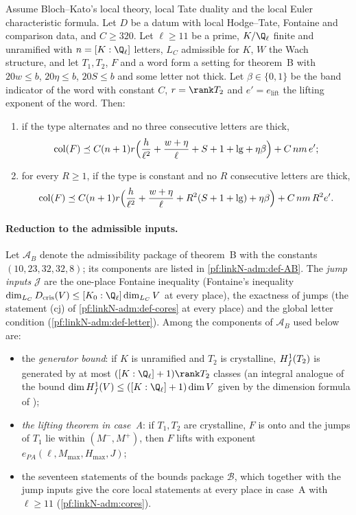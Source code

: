 \begin{theorem}[Theorem~B]\label{pf:linkN-adm:thmB}
Assume Bloch--Kato's local theory, local Tate duality and the local Euler characteristic formula. Let $D$ be a datum with
local Hodge--Tate, Fontaine and comparison data, and $C\ge320$. Let $\ell\ge11$ be a prime, $K/\Q_\ell$ finite and
unramified with $n=[K:\Q_\ell]$ letters, $L_C$ admissible for $K$, $W$ the Wach structure, and let $T_1,T_2$, $F$ and a word
form a setting for theorem~B with $20w\le b$, $20\eta\le b$, $20S\le b$ and some letter not thick. Let $\beta\in\{0,1\}$ be the band
indicator of the word with constant $C$, $r=\rank T_2$ and $e'=e_{\mathrm{lift}}$ the lifting exponent of the word. Then:
\begin{enumerate}[label=(\alph*)]
\item if the type alternates and no three consecutive letters are thick,
\[
\operatorname{col}(F)\preceq C(n+1)r\Bigl(\frac h{\ell^2}+\frac{w+\eta}{\ell}+S+1+\mathrm{lg}+\eta\beta\Bigr)+C\,nm\,e';
\]
\item for every $R\ge1$, if the type is constant and no $R$ consecutive letters are thick,
\[
\operatorname{col}(F)\preceq C(n+1)r\Bigl(\frac h{\ell^2}+\frac{w+\eta}{\ell}+R^2(S+1+\mathrm{lg})+\eta\beta\Bigr)+C\,nm\,R^2e'.
\]
\end{enumerate}
\end{theorem}

\paragraph{Reduction to the admissible inputs.}
Let $\mathcal A_B$ denote the admissibility package of theorem~B with the constants $(10,23,32,32,8)$; its components are
listed in \cref{pf:linkN-adm:def-AB}. The \emph{jump inputs} $\mathcal J$ are the one-place Fontaine inequality (Fontaine's
inequality $\dim_{L_C}D_{\mathrm{cris}}(V)\le[K_0:\Q_\ell]\dim_{L_C}V$ at every place), the exactness of jumps (the statement
(cj) of \cref{pf:linkN-adm:def-cores} at every place) and the global letter condition (\cref{pf:linkN-adm:def-letter}).
Among the components of $\mathcal A_B$ used below are:
\begin{itemize}
\item[(gen)] the \emph{generator bound}: if $K$ is unramified and $T_2$ is crystalline, $H^1_{f}(T_2)$ is generated by
  at most $([K:\Q_\ell]+1)\rank T_2$ classes (an integral analogue of the bound $\dim\linkNadmHf(V)\le([K:\Q_\ell]+1)\dim V$
  given by the dimension formula of \cite{BlochKato1990});
\item[(lift)] \emph{the lifting theorem in case~A}: if $T_1,T_2$ are crystalline, $F$ is onto and the jumps of $T_1$ lie
  within $(M^-,M^+)$, then $F$ lifts with exponent $e_{PA}(\ell,M_{\max},H_{\max},J)$;
\item[(cores)] the seventeen statements of the bounds package $\mathcal B$, which together with the jump inputs give the
  core local statements at every place in case~A with $\ell\ge11$ (\cref{pf:linkN-adm:cores}).
\end{itemize}

